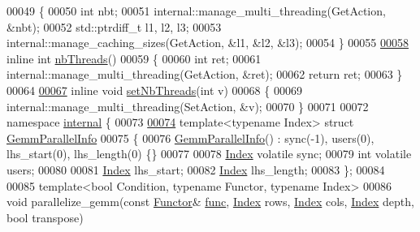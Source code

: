 \begin{DoxyCode}
00049 \{
00050   \textcolor{keywordtype}{int} nbt;
00051   internal::manage\_multi\_threading(GetAction, &nbt);
00052   std::ptrdiff\_t l1, l2, l3;
00053   internal::manage\_caching\_sizes(GetAction, &l1, &l2, &l3);
00054 \}
00055 
\hyperlink{namespace_eigen_a9aca97d83e21b91a04ec079360dfffeb}{00058} \textcolor{keyword}{inline} \textcolor{keywordtype}{int} \hyperlink{namespace_eigen_a9aca97d83e21b91a04ec079360dfffeb}{nbThreads}()
00059 \{
00060   \textcolor{keywordtype}{int} ret;
00061   internal::manage\_multi\_threading(GetAction, &ret);
00062   \textcolor{keywordflow}{return} ret;
00063 \}
00064 
\hyperlink{namespace_eigen_af9cd17c2fe18204239cd11c88c120b50}{00067} \textcolor{keyword}{inline} \textcolor{keywordtype}{void} \hyperlink{namespace_eigen_af9cd17c2fe18204239cd11c88c120b50}{setNbThreads}(\textcolor{keywordtype}{int} v)
00068 \{
00069   internal::manage\_multi\_threading(SetAction, &v);
00070 \}
00071 
00072 \textcolor{keyword}{namespace }\hyperlink{namespaceinternal}{internal} \{
00073 
\hyperlink{struct_eigen_1_1internal_1_1_gemm_parallel_info}{00074} \textcolor{keyword}{template}<\textcolor{keyword}{typename} Index> \textcolor{keyword}{struct }\hyperlink{struct_eigen_1_1internal_1_1_gemm_parallel_info}{GemmParallelInfo}
00075 \{
00076   \hyperlink{struct_eigen_1_1internal_1_1_gemm_parallel_info}{GemmParallelInfo}() : sync(-1), users(0), lhs\_start(0), lhs\_length(0) \{\}
00077 
00078   \hyperlink{namespace_eigen_a62e77e0933482dafde8fe197d9a2cfde}{Index} \textcolor{keyword}{volatile} sync;
00079   \textcolor{keywordtype}{int} \textcolor{keyword}{volatile} users;
00080 
00081   \hyperlink{namespace_eigen_a62e77e0933482dafde8fe197d9a2cfde}{Index} lhs\_start;
00082   \hyperlink{namespace_eigen_a62e77e0933482dafde8fe197d9a2cfde}{Index} lhs\_length;
00083 \};
00084 
00085 \textcolor{keyword}{template}<\textcolor{keywordtype}{bool} Condition, \textcolor{keyword}{typename} Functor, \textcolor{keyword}{typename} Index>
00086 \textcolor{keywordtype}{void} parallelize\_gemm(\textcolor{keyword}{const} \hyperlink{struct_functor}{Functor}& \hyperlink{structfunc}{func}, \hyperlink{namespace_eigen_a62e77e0933482dafde8fe197d9a2cfde}{Index} rows, \hyperlink{namespace_eigen_a62e77e0933482dafde8fe197d9a2cfde}{Index} cols, 
      \hyperlink{namespace_eigen_a62e77e0933482dafde8fe197d9a2cfde}{Index} depth, \textcolor{keywordtype}{bool} transpose)

\end{DoxyCode}
